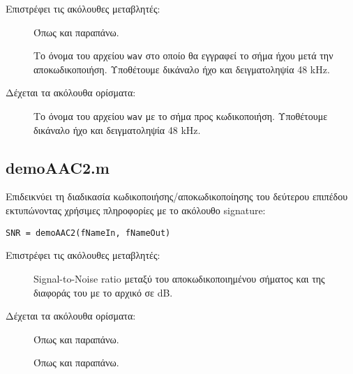 \noindent Επιστρέφει τις ακόλουθες μεταβλητές:
\begin{description}
\item[] Όπως και παραπάνω.
\item[] Το όνομα του αρχείου \verb|wav| στο οποίο θα εγγραφεί το
	σήμα ήχου μετά την αποκωδικοποιήση. Υποθέτουμε δικάναλο ήχο και
	δειγματοληψία 48 kHz.
\end{description}

\noindent Δέχεται τα ακόλουθα ορίσματα:
\begin{description}
\item[] Το όνομα του αρχείου \verb|wav| με το σήμα προς
	κωδικοποιήση. Υποθέτουμε δικάναλο ήχο και δειγματοληψία 48 kHz.
\end{description}


\subsection*{demoAAC2.m}
Επιδεικνύει τη διαδικασία κωδικοποιήσης/αποκωδικοποίησης του δεύτερου επιπέδου
εκτυπώνοντας χρήσιμες πληροφορίες με το ακόλουθο signature:
\begin{center}
	\verb|SNR = demoAAC2(fNameIn, fNameOut)|
\end{center}

\noindent Επιστρέφει τις ακόλουθες μεταβλητές:
\begin{description}
\item[] Signal-to-Noise ratio μεταξύ του αποκωδικοποιημένου σήματος και
	της διαφοράς του με το αρχικό σε dB.
\end{description}

\noindent Δέχεται τα ακόλουθα ορίσματα:
\begin{description}
\item[] Όπως και παραπάνω.
\item[] Όπως και παραπάνω.
\end{description}

